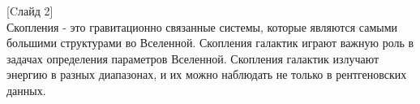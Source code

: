 \Introduction

[Cлайд 2]\\
Скопления - это гравитационно связанные системы, которые являются самыми большими структурами во 
Вселенной. Скопления галактик играют важную роль в задачах определения параметров Вселенной. 
Скопления галактик излучают энергию в разных диапазонах, и их можно наблюдать не только в 
рентгеновских данных.\\
